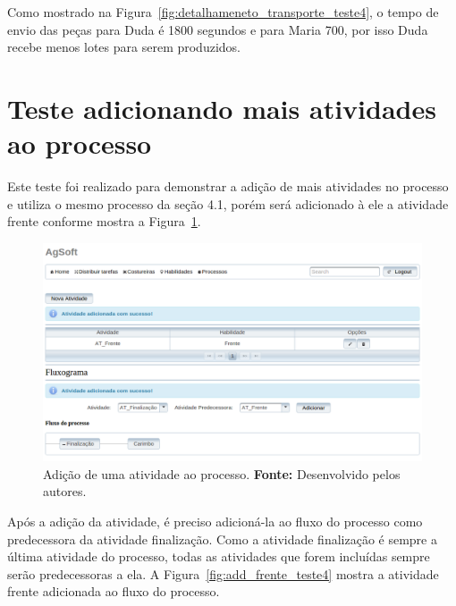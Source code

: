 \par Como mostrado na Figura~\ref{fig:detalhameneto_transporte_teste4}, o tempo
de envio das peças para Duda é 1800 segundos e para Maria 700, por isso
Duda recebe menos lotes para serem produzidos.


\section{Teste adicionando mais atividades ao processo}

\par Este teste foi realizado para demonstrar a adição de mais atividades no
processo e utiliza o mesmo processo da seção 4.1, porém será adicionado
à ele a atividade frente conforme mostra a Figura~\ref{fig:add_frente_teste5}.

\begin{figure}[h!]
	\centerline{\includegraphics[width=14.7cm]{./imagens/adiconar_atividade_frente_teste5.png}}
	\caption[Adição de uma atividade ao processo.]
	{Adição de uma atividade ao processo. \textbf{Fonte:} Desenvolvido pelos
	autores.}
	\label{fig:add_frente_teste5}
\end{figure}

\par Após a adição da atividade, é preciso adicioná-la ao fluxo do processo como
predecessora da atividade finalização. Como a atividade finalização é sempre a
última atividade do processo, todas as atividades que forem incluídas sempre
serão predecessoras a ela. A Figura~\ref{fig:add_frente_teste4} mostra a atividade frente adicionada
ao fluxo do processo.

\newpage


